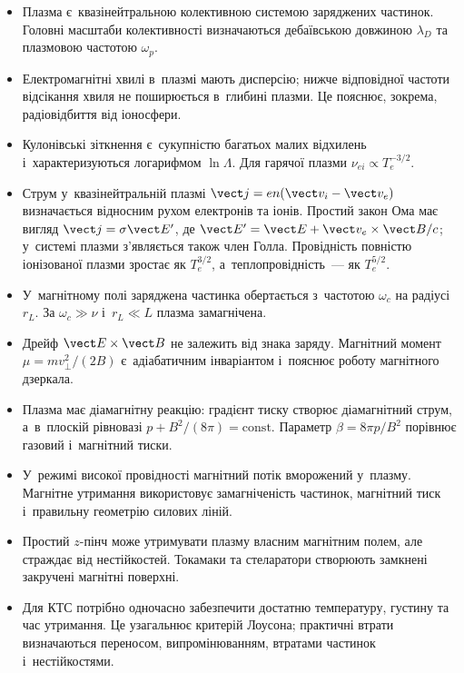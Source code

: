 \begin{itemize}
	\item Плазма є~квазінейтральною колективною системою заряджених частинок. Головні
	      масштаби колективності визначаються дебаївською довжиною $\lambda_D$ та плазмовою
	      частотою $\omega_p$.
	\item Електромагнітні хвилі в~плазмі мають дисперсію; нижче відповідної частоти
	      відсікання хвиля не поширюється в~глибині плазми. Це пояснює, зокрема, радіовідбиття
	      від іоносфери.
	\item Кулонівські зіткнення є~сукупністю багатьох малих відхилень і~характеризуються
	      логарифмом $\ln\Lambda$. Для гарячої плазми $\nu_{ei}\propto T_e^{-3/2}$.
	\item Струм у~квазінейтральній плазмі $\vect j=en(\vect v_i-\vect v_e)$ визначається
	      відносним рухом електронів та іонів. Простий закон Ома має вигляд $\vect j=\sigma\vect
		      E'$, де $\vect E'=\vect E+\vect v_e\times\vect B/c$; у~системі плазми з'являється також
	      член Голла. Провідність повністю іонізованої плазми зростає як $T_e^{3/2}$,
	      а~теплопровідність~--- як $T_e^{5/2}$.
	\item У~магнітному полі заряджена частинка обертається з~частотою $\omega_c$ на радіусі
	      $r_L$. За $\omega_c\gg\nu$ і~$r_L\ll L$ плазма замагнічена.
	\item Дрейф $\vect E\times\vect B$ не залежить від знака заряду. Магнітний момент
	      $\mu=mv_\perp^2/(2B)$ є~адіабатичним інваріантом і~пояснює роботу магнітного дзеркала.
	\item Плазма має діамагнітну реакцію: градієнт тиску створює діамагнітний струм,
	      а~в~плоскій рівновазі $p+B^2/(8\pi)=\mathrm{const}$. Параметр $\beta=8\pi p/B^2$
	      порівнює газовий і~магнітний тиски.
	\item У~режимі високої провідності магнітний потік вморожений у~плазму. Магнітне
	      утримання використовує замагніченість частинок, магнітний тиск і~правильну геометрію
	      силових ліній.
	\item Простий $z$-пінч може утримувати плазму власним магнітним полем, але страждає від
	      нестійкостей. Токамаки та стеларатори створюють замкнені закручені магнітні поверхні.
	\item Для КТС потрібно одночасно забезпечити достатню температуру, густину та час
	      утримання. Це узагальнює критерій Лоусона; практичні втрати визначаються переносом,
	      випромінюванням, втратами частинок і~нестійкостями.
\end{itemize}



